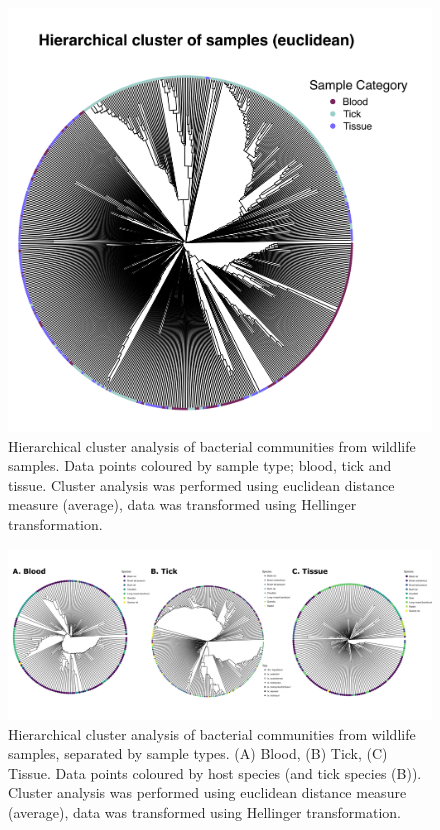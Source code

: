 \documentclass[a4paper, nobind]{templates/ociamthesis}
\begin{document}
\begin{figure}
\includegraphics[width=0.95\linewidth]{figures/ms-figs-appendix/FigA-3.9} \caption[Hierarchical cluster analysis of bacterial communities - all samples.]{Hierarchical cluster analysis of bacterial communities from wildlife samples. Data points coloured by sample type; blood, tick and tissue. Cluster analysis was performed using euclidean distance measure (average), data was transformed using Hellinger transformation.}\label{fig:FA39}
\end{figure}

\newpage

\begin{figure}
\includegraphics[width=0.95\linewidth]{figures/ms-figs-appendix/FigA-3.10} \caption[Hierarchical cluster analysis of bacterial communities - by sample type.]{Hierarchical cluster analysis of bacterial communities from wildlife samples, separated by sample types. (A) Blood, (B) Tick, (C) Tissue. Data points coloured by host species (and tick species (B)). Cluster analysis was performed using euclidean distance measure (average), data was transformed using Hellinger transformation.}\label{fig:FA310}
\end{figure}
\end{document}
